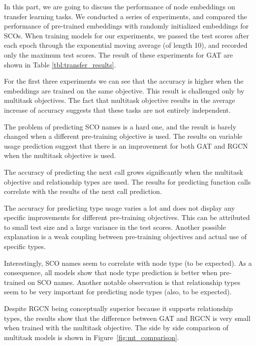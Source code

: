 \documentclass[a4paper,twoside]{article}
\begin{document}
In this part, we are going to discuss the performance of node embeddings on transfer learning tasks. We conducted a series of experiments, and compared the performance of pre-trained embeddings with randomly initialized embeddings for SCOs. When training models for our experiments, we passed the test scores after each epoch through the exponential moving average (of length 10), and recorded only the maximum test scores. The result of these experiments for GAT are shown in Table \ref{tbl:transfer_results}.

For the first three experiments we can see that the accuracy is higher when the embeddings are trained on the same objective. This result is challenged only by multitask objectives. The fact that multitask objective results in the average increase of accuracy suggests that these tasks are not entirely independent.

The problem of predicting SCO names is a hard one, and the result is barely changed when a different pre-training objective is used. The results on variable usage prediction suggest that there is an improvement for both GAT and RGCN when the multitask objective is used. 

The accuracy of predicting the next call grows significantly when the multitask objective and relationship types are used. The results for predicting function calls correlate with the results of the next call prediction. 

The accuracy for predicting type usage varies a lot and does not display any specific improvements for different pre-training objectives. This can be attributed to small test size and a large variance in the test scores. Another possible explanation is a weak coupling between pre-training objectives and actual use of specific types. 

Interestingly, SCO names seem to correlate with node type (to be expected). As a consequence, all models show that node type prediction is better when pre-trained on SCO names. Another notable observation is that relationship types seem to be very important for predicting node types (also, to be expected).

Despite RGCN being conceptually superior because it supports relationship types, the results show that the difference between GAT and RGCN is very small when trained with the multitask objective. The side by side comparison of multitask models is shown in Figure~\ref{fig:mt_comparison}. 
\end{document}
